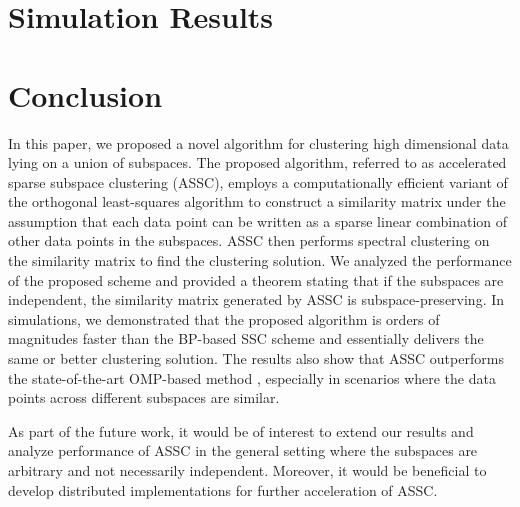 \documentclass{article}
\begin{document}
\section{Simulation Results}\label{sec:sim}

\vspace{-0.2cm}
\section{Conclusion} \label{sec:concl}
In this paper, we proposed a novel algorithm for clustering high dimensional data lying on a union of subspaces. The proposed algorithm, referred to as accelerated sparse subspace clustering (ASSC), employs a computationally efficient variant of the orthogonal least-squares algorithm to construct a similarity matrix under the assumption that each data point can be written as a sparse linear combination of other data points in the subspaces. ASSC then performs spectral clustering on the similarity matrix to find the clustering solution. We analyzed the performance of the proposed scheme and provided a theorem stating that if the subspaces are independent, the similarity matrix generated by ASSC is subspace-preserving. In simulations, we demonstrated that the proposed algorithm is orders of magnitudes faster than the BP-based SSC scheme \cite{elhamifar2009sparse,elhamifar2013sparse} and essentially delivers the same or better clustering solution. The results also show that ASSC outperforms the state-of-the-art OMP-based method \cite{dyer2013greedy,you2015sparse}, especially in scenarios where the data points across different subspaces are similar. 

As part of the future work, it would be of interest to extend our results and analyze performance of ASSC in the general setting where the subspaces are arbitrary and not necessarily independent. Moreover, it would be beneficial to develop distributed implementations for further acceleration of ASSC.

\clearpage
\small

\end{document}
